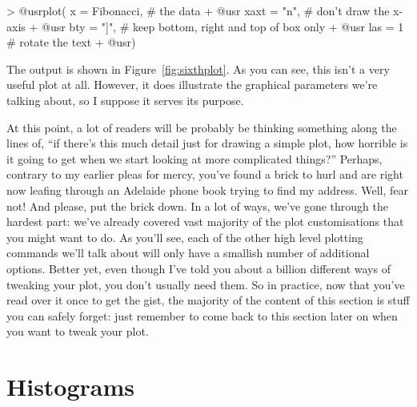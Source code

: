 \begin{rblock1}
> @usr{plot( x = Fibonacci,}   # the data
+ @usr{      xaxt = "n",}      # don't draw the x-axis
+ @usr{      bty = "]",}       # keep bottom, right and top of box only
+ @usr{      las = 1}          # rotate the text
+ @usr{)}
\end{rblock1}
The output is shown in Figure~\ref{fig:sixthplot}. As you can see, this isn't a very useful plot at all. However, it does illustrate the graphical parameters we're talking about, so I suppose it serves its purpose.




At this point, a lot of readers will be probably be thinking something along the lines of, ``if there's this much detail just for drawing a simple plot, how horrible is it going to get when we start looking at more complicated things?'' Perhaps, contrary to my earlier pleas for mercy, you've found a brick to hurl and are right now leafing through an Adelaide phone book trying to find my address. Well, fear not! And please, put the brick down. In a lot of ways, we've gone through the hardest part: we've already covered vast majority of the plot customisations that you might want to do. As you'll see, each of the other high level plotting commands we'll talk about will only have a smallish number of additional options. Better yet, even though I've told you about a billion different ways of tweaking your plot, you don't usually need them. So in practice, now that you've read over it once to get the gist, the majority of the content of this section is stuff you can safely forget: just remember to come back to this section later on when you want to tweak your plot. 

\section{Histograms\label{sec:hist}}
 
